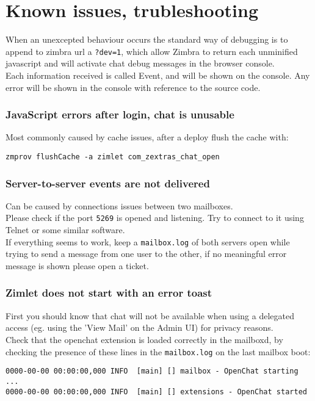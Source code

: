 \chapter{Known issues, trubleshooting}

When an unexcepted behaviour occurs the standard way of debugging is to append to zimbra url a \verb!?dev=1!, which allow
 Zimbra to return each unminified javascript and will activate chat debug messages in the browser console.\\

Each information received is called Event, and will be shown on the console. Any error will be shown in the console with
 reference to the source code.

\subsection{JavaScript errors after login, chat is unusable}
Most commonly caused by cache issues, after a deploy flush the cache with:
\begin{verbatim}
zmprov flushCache -a zimlet com_zextras_chat_open
\end{verbatim}

\subsection{Server-to-server events are not delivered}
Can be caused by connections issues between two mailboxes.\\

Please check if the port \verb!5269! is opened and listening. Try to connect to it using Telnet or some similar software.\\

If everything seems to work, keep a \verb!mailbox.log! of both servers open while trying to send a message from one user
to the other, if no meaningful error message is shown please open a ticket.

\subsection{Zimlet does not start with an error toast}
First you should know that chat will not be available when using a delegated access (eg. using the 'View Mail' on the Admin UI)
for privacy reasons.\\

Check that the openchat extension is loaded correctly in the mailboxd, by checking the presence of these lines in the
\verb!mailbox.log! on the last mailbox boot:
\begin{verbatim}
0000-00-00 00:00:00,000 INFO  [main] [] mailbox - OpenChat starting ...
0000-00-00 00:00:00,000 INFO  [main] [] extensions - OpenChat started
\end{verbatim}
